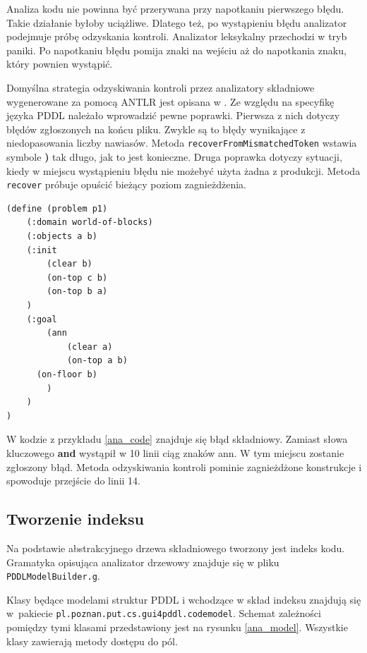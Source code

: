 Analiza kodu nie powinna być przerywana przy napotkaniu pierwszego błędu. Takie
działanie byłoby uciążliwe. Dlatego też, po wystąpieniu błędu analizator podejmuje
próbę odzyskania kontroli. Analizator leksykalny przechodzi w tryb paniki. Po napotkaniu 
błędu pomija znaki na wejściu aż do napotkania znaku, który pownien wystąpić.

\begin{sloppypar}
Domyślna strategia odzyskiwania kontroli przez analizatory składniowe wygenerowane 
za pomocą ANTLR jest opisana w \cite{antlr}. Ze względu na specyfikę języka PDDL
należało wprowadzić pewne poprawki. Pierwsza z nich dotyczy błędów zgłoszonych na końcu pliku.
Zwykle są to błędy wynikające z niedopasowania liczby nawiasów.
Metoda \texttt{recoverFromMismatchedToken} wstawia symbole \textbf{)} tak długo, jak to jest konieczne.
Druga poprawka dotyczy sytuacji, kiedy w miejscu wystąpieniu błędu nie możebyć użyta żadna
z produkcji. Metoda \texttt{recover} próbuje opuścić bieżący poziom zagnieżdżenia.
\end{sloppypar}

\begin{Code}
\begin{lstlisting}[language=LISP,frame=single,label=ana_code, caption=Kod PDDL zawierający błąd składniowy]
(define (problem p1)
	(:domain world-of-blocks)
	(:objects a b)
	(:init
		(clear b)
		(on-top c b)
		(on-top b a)
	)
	(:goal
		(ann
			(clear a)
			(on-top a b)
      (on-floor b)
		)
	)
)
\end{lstlisting}
\end{Code}

W kodzie z przykładu \ref{ana_code} znajduje się błąd składniowy. Zamiast słowa kluczowego \textbf{and}
wystąpił w 10 linii ciąg znaków ann. W tym miejscu zostanie zgłoszony błąd. Metoda odzyskiwania kontroli
pominie zagnieżdżone konstrukcje i spowoduje przejście do linii 14.

\subsection{Tworzenie indeksu}
\label{subsec:indeks}
Na podstawie abstrakcyjnego drzewa składniowego tworzony jest indeks kodu. 
Gramatyka opisująca analizator drzewowy znajduje się w pliku \texttt{PDDLModelBuilder.g}.

Klasy będące modelami struktur PDDL i wchodzące w skład indeksu znajdują się w~pakiecie
\texttt{pl.poznan.put.cs.gui4pddl.codemodel}. Schemat zależności pomiędzy tymi klasami
przedstawiony jest na rysunku \ref{ana_model}. Wszystkie klasy zawierają metody dostępu
do pól.

